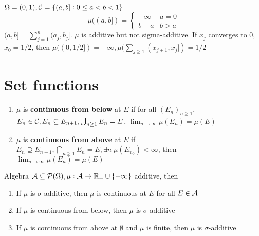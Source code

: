 \documentclass[11pt]{article}
\begin{document}
\begin{examplle}[]
\(\Omega=(0,1),\mathcal{C}=\{(a,b]:0\le a<b<1\}\)
\begin{equation*}
\mu((a,b])=
\begin{cases}
+\infty&a=0\\
b-a&b>a
\end{cases}
\end{equation*}
\((a,b]=\sum_{j=1}^n(a_j,b_j]\). \(\mu\) is additive but not sigma-additive. If \(x_j\)
converges to 0, \(x_0=1/2\), then \(\mu((0,1/2])=+\infty,\mu(\sum_{j\ge1}(x_{j+1},x_j])=1/2\)
\end{examplle}

\section{Set functions}
\label{sec:org35e3fb4}
\begin{definition}[]
\begin{enumerate}
\item \(\mu\) is \textbf{continuous from below} at \(E\) if for all \((E_n)_{n\ge1}\),
\(E_n\in\mathcal{C},E_n\subseteq E_{n+1},\bigcup_{n\ge1}E_n=E\),
\(\lim_{n\to\infty}\mu(E_n)=\mu(E)\)
\item \(\mu\) is \textbf{continuous from above} at \(E\) if \(E_n\supseteq
   E_{n+1},\bigcap_{n\ge1}E_n=E,\exists n\;\mu(E_{n_0})<\infty\), then
\(\lim_{n\to\infty}\mu(E_n)=\mu(E)\)
\end{enumerate}
\end{definition}

\begin{lemma}[]
Algebra \(\mathcal{A}\subseteq\mathcal{P}(\Omega),\mu:\mathcal{A}\to\mathbb{R}_+\cup\{+\infty\}\) additive,
then
\begin{enumerate}
\item If \(\mu\) is \(\sigma\)-additive, then \(\mu\) is continuous at \(E\) for all \(E\in\mathcal{A}\)
\item If \(\mu\) is continuous from below, then \(\mu\) is \(\sigma\)-additive
\item If \(\mu\) is continuous from above at \(\emptyset\) and \(\mu\) is finite, then \(\mu\) is
\(\sigma\)-additive
\end{enumerate}
\end{lemma}
\end{document}
